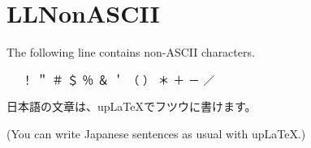 \section{LLNonASCII}

The following line contains non-ASCII characters.

\begin{CJK}{UTF8}{ipxm}{　} ！ ＂ ＃ ＄ ％ ＆ ＇ （ ） ＊ ＋ － ／\end{CJK}

\vspace{\baselineskip}

\begin{CJK}{UTF8}{ipxm}日本語の文章は、upLaTeXでフツウに書けます。\end{CJK}

(You can write Japanese sentences as usual with upLaTeX.)
